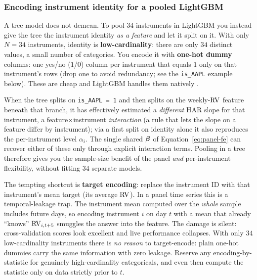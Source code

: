 \subsubsection*{Encoding instrument identity for a pooled LightGBM}

A tree model does not demean.  To pool $34$ instruments in LightGBM you instead
give the tree the instrument identity \emph{as a feature} and let it split on it.
With only $N = 34$ instruments, identity is \textbf{low-cardinality}: there are
only $34$ distinct values, a small number of categories.  You encode it with
\textbf{one-hot dummy} columns: one yes/no ($1$/$0$) column per instrument that
equals $1$ only on that instrument's rows (drop one to avoid redundancy; see the
\texttt{is\_AAPL} example below).  These are cheap and LightGBM handles them
natively \citep{Ke2017}.

\begin{keyidea}
When the tree splits on \texttt{is\_AAPL = 1} and then splits on the weekly-$\operatorname{RV}$
feature beneath that branch, it has effectively estimated a \emph{different} HAR
slope for that instrument, a feature$\times$instrument \emph{interaction} (a
rule that lets the slope on a feature differ by instrument); via a first split
on identity alone it also reproduces the per-instrument level $\alpha_i$.  The
single shared $\bm{\beta}$ of Equation~\eqref{eq:panel-fe} can recover either of
these only through explicit interaction terms.  Pooling in a tree therefore gives you the
sample-size benefit of the panel \emph{and} per-instrument flexibility, without
fitting $34$ separate models.
\end{keyidea}

\begin{warning}
The tempting shortcut is \textbf{target encoding}: replace the instrument ID with
that instrument's mean target (its average $\operatorname{RV}$).  In a panel time series this
is a temporal-leakage trap.  The instrument mean computed over the \emph{whole}
sample includes future days, so encoding instrument $i$ on day $t$ with a mean
that already ``knows'' $\operatorname{RV}_{i,t+5}$ smuggles the answer into the feature.  The
damage is silent: cross-validation scores look excellent and live performance
collapses.  With only $34$ low-cardinality instruments there is \emph{no reason}
to target-encode: plain one-hot dummies carry the same information with zero
leakage.  Reserve any encoding-by-statistic for genuinely high-cardinality
categoricals, and even then compute the statistic only on data strictly prior to
$t$.
\end{warning}

